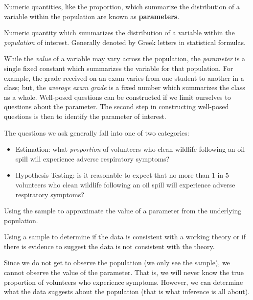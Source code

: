 \documentclass[]{book}
\providecommand{\tightlist}{%
  \setlength{\itemsep}{0pt}\setlength{\parskip}{0pt}}
\theoremstyle{plain}
\theoremstyle{mydefn}
\theoremstyle{myexmpl}
\theoremstyle{remark}
\let\BeginKnitrBlock\begin \let\EndKnitrBlock\end
\let\BeginKnitrBlock\begin \let\EndKnitrBlock\end
\begin{document}
Numeric quantities, like the proportion, which summarize the
distribution of a variable within the population are known as
\textbf{parameters}.

\BeginKnitrBlock{definition}[Parameter]
\protect\hypertarget{def:defn-parameter}{}{\label{def:defn-parameter}
{} }Numeric quantity which summarizes the
distribution of a variable within the \emph{population} of interest.
Generally denoted by Greek letters in statistical formulas.
\EndKnitrBlock{definition}

While the \emph{value} of a variable may vary across the population, the
\emph{parameter} is a single fixed constant which summarizes the
variable for that population. For example, the grade received on an exam
varies from one student to another in a class; but, the \emph{average
exam grade} is a fixed number which summarizes the class as a whole.
Well-posed questions can be constructed if we limit ourselves to
questions about the parameter. The second step in constructing
well-posed questions is then to identify the parameter of interest.

The questions we ask generally fall into one of two categories:

\begin{itemize}
\tightlist
\item
  Estimation: what \emph{proportion} of volunteers who clean wildlife
  following an oil spill will experience adverse respiratory symptoms?
\item
  Hypothesis Testing: is it reasonable to expect that no more than 1 in
  5 volunteers who clean wildlife following an oil spill will experience
  adverse respiratory symptoms?
\end{itemize}

\BeginKnitrBlock{definition}[Estimation]
\protect\hypertarget{def:defn-estimation}{}{\label{def:defn-estimation}
{} }Using the sample to approximate the value
of a parameter from the underlying population.
\EndKnitrBlock{definition}

\BeginKnitrBlock{definition}[Hypothesis Testing]
\protect\hypertarget{def:defn-hypothesis-testing}{}{\label{def:defn-hypothesis-testing}
{} }Using a sample to determine if the
data is consistent with a working theory or if there is evidence to
suggest the data is not consistent with the theory.
\EndKnitrBlock{definition}

Since we do not get to observe the population (we only see the sample),
we cannot observe the value of the parameter. That is, we will never
know the true proportion of volunteers who experience symptoms. However,
we can determine what the data suggests about the population (that is
what inference is all about).
\end{document}
